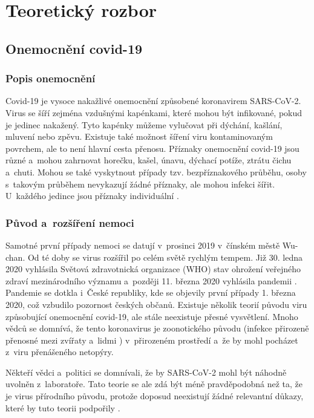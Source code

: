 \chapter{Teoretický rozbor}

\section{Onemocnění covid-19}
\subsection{Popis onemocnění}

Covid-19 je vysoce nakažlivé onemocnění způsobené koronavirem SARS-CoV-2. Virus se šíří zejména vzdušnými kapénkami, které mohou být infikované, pokud je jedinec nakažený. Tyto kapénky můžeme vylučovat při dýchání, kašlání, mluvení nebo zpěvu. Existuje také možnost šíření viru kontaminovaným povrchem, ale to není hlavní cesta přenosu. Příznaky onemocnění covid-19 jsou různé a~mohou zahrnovat horečku, kašel, únavu, dýchací potíže, ztrátu čichu a~chuti. Mohou se také vyskytnout případy tzv. bezpříznakového průběhu, osoby s~takovým průběhem nevykazují žádné příznaky, ale mohou infekci šířit. U~každého jedince jsou příznaky individuální \cite{covid-info-gov}.

\subsection{Původ a~rozšíření nemoci}
Samotné první případy nemoci se datují v~prosinci 2019 v~čínském městě Wu-chan. Od té doby se virus rozšířil po celém světě rychlým tempem. Již 30. ledna 2020 vyhlásila Světová zdravotnická organizace (WHO) stav ohrožení veřejného zdraví mezinárodního významu a~později 11. března 2020 vyhlásila pandemii \cite{covid-19-who}. Pandemie se dotkla i~České republiky, kde se objevily první případy 1. března 2020, což vzbudilo pozornost českých občanů. Existuje několik teorií původu viru způsobující onemocnění covid-19, ale stále neexistuje přesné vysvětlení. Mnoho vědců se domnívá, že tento koronavirus je zoonotického původu (infekce přirozeně přenosné mezi zvířaty a~lidmi \cite{covid-19-zoonoza}) v~přirozeném prostředí a~že by mohl pocházet z~viru přenášeného netopýry. 

Někteří vědci a~politici se domnívali, že by SARS-CoV-2 mohl být náhodně uvolněn z~laboratoře. Tato teorie se ale zdá být méně pravděpodobná než ta, že je virus přírodního původu, protože doposud neexistují žádné relevantní důkazy, které by tuto teorii podpořily \cite{covid-19-origin}.

